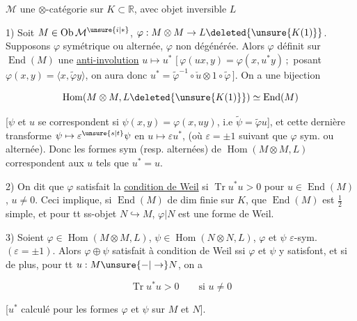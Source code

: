 

 $\mathcal M$ une $\otimes$-catégorie sur $K\subset\mathbb R$, avec   objet inversible  $L$

1) Soit $M\in\operatorname{Ob}\mathcal M^{\unsure{i|*}}$, $\varphi:M\otimes M\to L\deleted{\unsure{K(1)}}$. Supposons $\varphi$ symétrique ou alternée, $\varphi$ non dégénérée. Alors $\varphi$ définit sur $\operatorname{End}(M)$ une \uline{anti-involution} $u\mapsto u^*$ $[\,\varphi(ux,y)=\varphi(x,u^*y)\,;$ posant $\varphi(x,y)=\langle x,\widetilde\varphi y\rangle$,  on aura donc $u^*=\widetilde\varphi^{-1}\circ\check u\otimes1\circ\widetilde\varphi\,]$.  On a une bijection

\[
\operatorname{Hom}(M\otimes M,L\deleted{\unsure{K(1)}})\simeq\operatorname{End}(M)
\]

[$\psi$ et $u$ se correspondent si $\psi(x,y)=\varphi(x,uy)$, i.e $\widetilde\psi=\widetilde\varphi u$], et cette dernière  transforme $\psi\mapsto\varepsilon{}^{\unsure{s|t}}\psi$ en $u\mapsto\varepsilon u^*$, (où $\varepsilon=\pm1$ suivant que $\varphi$ sym. ou alternée). Donc les formes sym (resp. alternées) de $\operatorname{Hom}(M\otimes M,L)$ correspondent aux $u$ tels que $u^*=u$.

2) On dit que $\varphi$  satisfait la \uline{condition de Weil} si  $\operatorname{Tr}u^*u>0$ pour $u\in\operatorname{End}(M)$, $u\ne0$. Ceci implique, si $\operatorname{End}(M)$ de dim finie sur $K$, que $\operatorname{End}(M)$ est $\frac12$ simple, et pour tt ss-objet $N\hookrightarrow M$, $\varphi|N$ est une forme de Weil.


3)  Soient $\varphi\in\operatorname{Hom}(M\otimes M,L)$, $\psi\in\operatorname{Hom}(N\otimes N,L)$, $\varphi$ et $\psi$ $\varepsilon$-sym. $(\varepsilon=\pm1)$. Alors $\varphi\oplus\psi$ satisfait à condition de Weil ssi $\varphi$ et $\psi$ y satisfont, et si de plus, pour tt $u:M\unsure{-|\to}N$, on a


\[
\operatorname{Tr}u^*u>0\qquad\text{si }u\ne0
\]

[$u^*$ calculé pour les formes $\varphi$ et $\psi$ sur $M$ et $N$].

